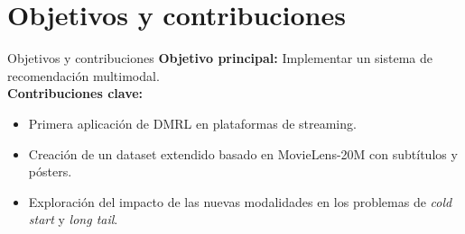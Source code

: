\documentclass{beamer}
\begin{document}
\section{Objetivos y contribuciones}
\begin{frame}{Objetivos y contribuciones}
    \textbf{Objetivo principal:} Implementar un sistema de recomendación multimodal. \\
    \vspace{0.5cm}
    \textbf{Contribuciones clave:}
    \begin{itemize}
        \item Primera aplicación de DMRL en plataformas de streaming.
        \item Creación de un dataset extendido basado en MovieLens-20M con subtítulos y pósters.
        \item Exploración del impacto de las nuevas modalidades en los problemas de \textit{cold start} y \textit{long tail}.
    \end{itemize}
\end{frame}

\end{document}

